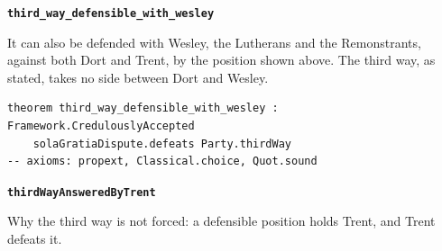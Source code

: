 \documentclass[11pt]{article}
\begin{document}
\par\medskip\noindent\textbf{\texttt{third\_\allowbreak{}way\_\allowbreak{}defensible\_\allowbreak{}with\_\allowbreak{}wesley}}\par\nobreak\noindent
It can also be defended with Wesley, the Lutherans and the Remonstrants, against both Dort and Trent, by the position shown above. The third way, as stated, takes no side between Dort and Wesley.

{\small\begin{verbatim}
theorem third_way_defensible_with_wesley : Framework.CredulouslyAccepted
    solaGratiaDispute.defeats Party.thirdWay
-- axioms: propext, Classical.choice, Quot.sound
\end{verbatim}}
\par\medskip\noindent\textbf{\texttt{third\allowbreak{}Way\allowbreak{}Answered\allowbreak{}By\allowbreak{}Trent}}\par\nobreak\noindent
Why the third way is not forced: a defensible position holds Trent, and Trent defeats it.
\end{document}
